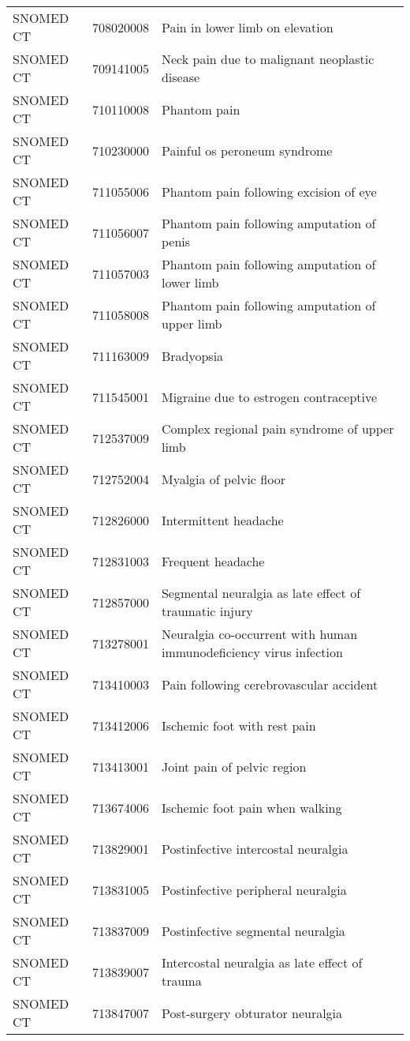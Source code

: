 \begin{longtable}{p{}p{}p{}}
  SNOMED CT & 708020008 & Pain in lower limb on elevation \\ 
  SNOMED CT & 709141005 & Neck pain due to malignant neoplastic disease \\ 
  SNOMED CT & 710110008 & Phantom pain \\ 
  SNOMED CT & 710230000 & Painful os peroneum syndrome \\ 
  SNOMED CT & 711055006 & Phantom pain following excision of eye \\ 
  SNOMED CT & 711056007 & Phantom pain following amputation of penis \\ 
  SNOMED CT & 711057003 & Phantom pain following amputation of lower limb \\ 
  SNOMED CT & 711058008 & Phantom pain following amputation of upper limb \\ 
  SNOMED CT & 711163009 & Bradyopsia \\ 
  SNOMED CT & 711545001 & Migraine due to estrogen contraceptive \\ 
  SNOMED CT & 712537009 & Complex regional pain syndrome of upper limb \\ 
  SNOMED CT & 712752004 & Myalgia of pelvic floor \\ 
  SNOMED CT & 712826000 & Intermittent headache \\ 
  SNOMED CT & 712831003 & Frequent headache \\ 
  SNOMED CT & 712857000 & Segmental neuralgia as late effect of traumatic injury \\ 
  SNOMED CT & 713278001 & Neuralgia co-occurrent with human immunodeficiency virus infection \\ 
  SNOMED CT & 713410003 & Pain following cerebrovascular accident \\ 
  SNOMED CT & 713412006 & Ischemic foot with rest pain \\ 
  SNOMED CT & 713413001 & Joint pain of pelvic region \\ 
  SNOMED CT & 713674006 & Ischemic foot pain when walking \\ 
  SNOMED CT & 713829001 & Postinfective intercostal neuralgia \\ 
  SNOMED CT & 713831005 & Postinfective peripheral neuralgia \\ 
  SNOMED CT & 713837009 & Postinfective segmental neuralgia \\ 
  SNOMED CT & 713839007 & Intercostal neuralgia as late effect of trauma \\ 
  SNOMED CT & 713847007 & Post-surgery obturator neuralgia \\ 

\end{longtable}
